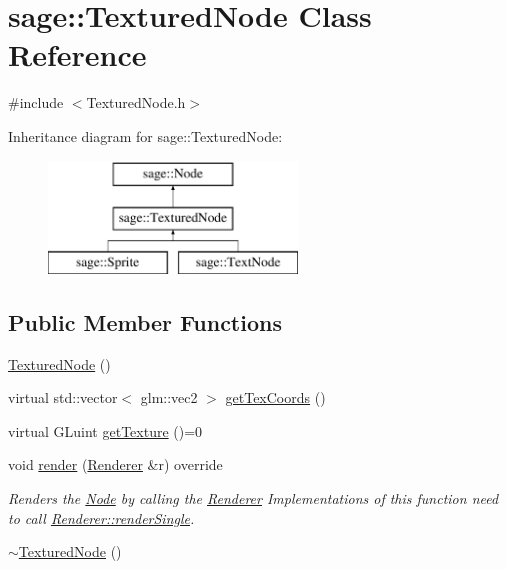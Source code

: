 \hypertarget{classsage_1_1TexturedNode}{}\section{sage\+::Textured\+Node Class Reference}
\label{classsage_1_1TexturedNode}


{\ttfamily \#include $<$Textured\+Node.\+h$>$}

Inheritance diagram for sage\+::Textured\+Node\+:\begin{figure}[H]
\begin{center}
\leavevmode
\includegraphics[height=3.000000cm]{classsage_1_1TexturedNode}
\end{center}
\end{figure}
\subsection*{Public Member Functions}
\begin{DoxyCompactItemize}
\item 
\mbox{\hyperlink{classsage_1_1TexturedNode_a90aacfe1eb94e56ecf8176d7c7b74388}{Textured\+Node}} ()
\item 
virtual std\+::vector$<$ glm\+::vec2 $>$ \mbox{\hyperlink{classsage_1_1TexturedNode_ada858d240f8074fd97e8a72e74d18a30}{get\+Tex\+Coords}} ()
\item 
virtual G\+Luint \mbox{\hyperlink{classsage_1_1TexturedNode_a079cea0b12a1d0e3ea69459546736c0f}{get\+Texture}} ()=0
\item 
void \mbox{\hyperlink{classsage_1_1TexturedNode_a3ced7cf384aac86fb84face2dc62e395}{render}} (\mbox{\hyperlink{classsage_1_1Renderer}{Renderer}} \&r) override
\begin{DoxyCompactList}\small\item\em Renders the \mbox{\hyperlink{classsage_1_1Node}{Node}} by calling the \mbox{\hyperlink{classsage_1_1Renderer}{Renderer}} Implementations of this function need to call \mbox{\hyperlink{classsage_1_1Renderer_aa79cfd587fa85ae8ea7ccf465825d212}{Renderer\+::render\+Single}}. \end{DoxyCompactList}\item 
\mbox{\hyperlink{classsage_1_1TexturedNode_a2c67c0ec8c8839308a56e0aea6839b3e}{$\sim$\+Textured\+Node}} ()
\end{DoxyCompactItemize}
